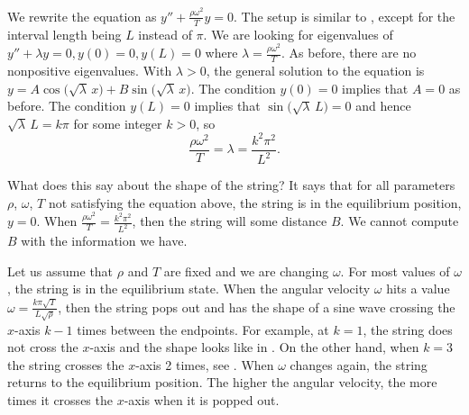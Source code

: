 \begin{myfig}
\capstart
{}
\caption{Whirling string.\label{bvp:whirstringfig}}
\end{myfig}

We rewrite the equation as
$y'' + \frac{\rho \omega^2}{T} y = 0$.
The setup is similar to , except for the
interval length being $L$ instead of $\pi$.  We are looking for eigenvalues
of $y'' + \lambda y = 0, y(0) = 0, y(L) = 0$ where
$\lambda = \frac{\rho \omega^2}{T}$.  As before,
there are no nonpositive eigenvalues.  With $\lambda > 0$,
the general solution to the equation is
$y = A \cos \bigl(  \sqrt{\lambda} \,x \bigr)
+ B \sin \bigl( \sqrt{\lambda} \,x \bigr)$.
The condition $y(0) = 0$ implies that $A = 0$ as
before.  The condition $y(L) = 0$ implies that
$\sin \bigl( \sqrt{\lambda} \, L\bigr) = 0$ and hence
$\sqrt{\lambda} \, L = k \pi$  for some integer $k > 0$, so
\begin{equation*}
\frac{\rho \omega^2}{T} = \lambda = \frac{k^2 \pi^2}{L^2} .
\end{equation*}

What does this say about the shape of the string?  It says that for
all parameters $\rho$, $\omega$, $T$ not satisfying the equation above, the
string is in the equilibrium position, $y=0$.  When 
$\frac{\rho \omega^2}{T} = \frac{k^2 \pi^2}{L^2}$, then the string will
 some distance $B$.  We cannot compute $B$
with the information we have.

Let us assume that $\rho$ and $T$ are fixed and we are changing $\omega$.
For most values of $\omega$, the string is in the equilibrium state.  When 
the angular velocity $\omega$ hits a value
$\omega = \frac{k \pi \sqrt{T}}{L\sqrt{\rho}}$, then the string 
pops out and has the shape of a sine wave crossing the
$x$-axis $k-1$ times between the endpoints.
For example, at $k=1$, the string does not cross the $x$-axis
and the shape looks like in .
On the other hand, when $k=3$ the string crosses the $x$-axis
2 times, see .
When $\omega$ changes again, the string returns to
the equilibrium position.  The higher the angular velocity,
the more times it crosses the $x$-axis when it is popped out.

